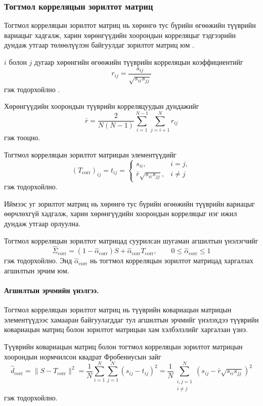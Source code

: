 \subsubsection{Тогтмол корреляцын зорилтот матриц}

Тогтмол корреляцын зорилтот матриц нь хөрөнгө тус бүрийн
өгөөжийн түүврийн вариацыг хадгалж, харин хөрөнгүүдийн
хоорондын корреляцыг тэдгээрийн дундаж утгаар
төлөөлүүлэн байгуулдаг зорилтот матриц юм
\citep{ledoitwolf2004b}.

$i$ болон $j$ дугаар хөрөнгийн өгөөжийн
түүврийн корреляцын коэффициентийг
\[
r_{ij}
=
\frac{s_{ij}}{\sqrt{s_{ii}s_{jj}}}
\]
гэж тодорхойлно \citep{ledoitwolf2004b}.

Хөрөнгүүдийн хоорондын түүврийн
корреляцуудын дундажийг
\[
\bar r
=
\frac{2}{N(N-1)}
\sum_{i=1}^{N-1}
\sum_{j=i+1}^{N}r_{ij}
\]
гэж тооцно.

Тогтмол корреляцын зорилтот матрицын
элементүүдийг
\[
(T_{\mathrm{corr}})_{ij}
=
t_{ij}
=
\begin{cases}
	s_{ii}, & i=j,\\
	\bar r\sqrt{s_{ii}s_{jj}}, & i\neq j
\end{cases}
\]
гэж тодорхойлно.

Иймээс уг зорилтот матриц нь хөрөнгө тус бүрийн
өгөөжийн түүврийн вариацыг өөрчлөхгүй хадгалж,
харин хөрөнгүүдийн хоорондын корреляцыг
нэг ижил дундаж утгаар орлуулна.

Тогтмол корреляцын зорилтот матрицад
суурилсан шугаман агшилтын үнэлэгчийг
\[
\widehat{\Sigma}_{\mathrm{corr}}
=
(1-\widehat{\alpha}_{\mathrm{corr}})S
+
\widehat{\alpha}_{\mathrm{corr}}T_{\mathrm{corr}},
\qquad
0\leq\widehat{\alpha}_{\mathrm{corr}}\leq1
\]
гэж тодорхойлно. Энд
$\widehat{\alpha}_{\mathrm{corr}}$ нь тогтмол
корреляцын зорилтот матрицад харгалзах
агшилтын эрчим юм.

\paragraph{Агшилтын эрчмийн үнэлгээ.}

Тогтмол корреляцын зорилтот матриц нь
түүврийн ковариацын матрицын элементүүдээс
хамааран байгуулагддаг тул агшилтын
эрчмийг үнэлэхдээ түүврийн ковариацын
матриц болон зорилтот матрицын
хам хэлбэлзлийг харгалзан үзнэ.

Түүврийн ковариацын матриц болон
тогтмол корреляцын зорилтот матрицын
хоорондын нормчилсон квадрат
Фробениусын зайг
\[
\widehat d_{\mathrm{corr}}
=
\|S-T_{\mathrm{corr}}\|^2
=
\frac{1}{N}
\sum_{i=1}^{N}\sum_{j=1}^{N}
(s_{ij}-t_{ij})^2
=
\frac{1}{N}
\sum_{\substack{i,j=1\\i\neq j}}^{N}
\left(
s_{ij}-\bar r\sqrt{s_{ii}s_{jj}}
\right)^2
\]
гэж тодорхойлно.

